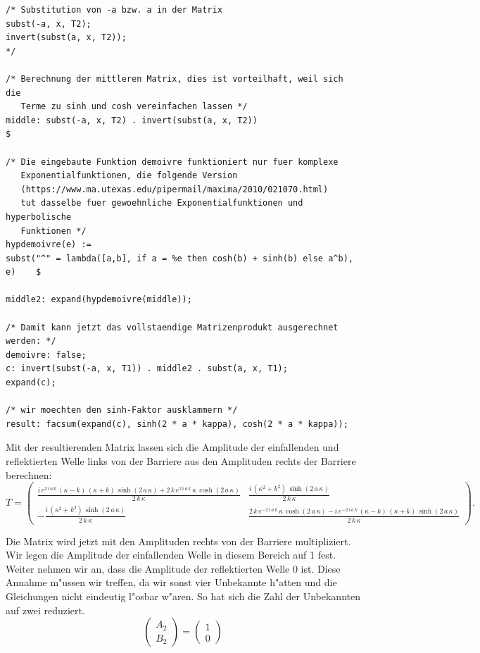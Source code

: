 \begin{refsection}
\begin{lstlisting}[style=Maxima]
/* Substitution von -a bzw. a in der Matrix
subst(-a, x, T2);
invert(subst(a, x, T2));
*/

/* Berechnung der mittleren Matrix, dies ist vorteilhaft, weil sich die
   Terme zu sinh und cosh vereinfachen lassen */
middle: subst(-a, x, T2) . invert(subst(a, x, T2))                          $

/* Die eingebaute Funktion demoivre funktioniert nur fuer komplexe
   Exponentialfunktionen, die folgende Version
   (https://www.ma.utexas.edu/pipermail/maxima/2010/021070.html)
   tut dasselbe fuer gewoehnliche Exponentialfunktionen und hyperbolische
   Funktionen */
hypdemoivre(e) :=
subst("^" = lambda([a,b], if a = %e then cosh(b) + sinh(b) else a^b), e)    $

middle2: expand(hypdemoivre(middle));

/* Damit kann jetzt das vollstaendige Matrizenprodukt ausgerechnet werden: */
demoivre: false;
c: invert(subst(-a, x, T1)) . middle2 . subst(a, x, T1);
expand(c);

/* wir moechten den sinh-Faktor ausklammern */
result: facsum(expand(c), sinh(2 * a * kappa), cosh(2 * a * kappa));

\end{lstlisting}

Mit der resultierenden Matrix lassen sich die Amplitude der einfallenden und reflektierten Welle links von der Barriere aus den Amplituden rechts der Barriere berechnen:
\[
T =
\begin{pmatrix}
\frac{i\,e^{2\,i\,a\,k}\,\left(\kappa-k\right)\,\left(\kappa+k
 \right)\,\sinh \left(2\,a\,\kappa\right)+2\,k\,e^{2\,i\,a\,k}\,
 \kappa\,\cosh \left(2\,a\,\kappa\right)}{2\,k\,\kappa}
&
\frac{i\,
 \left(\kappa^2+k^2\right)\,\sinh \left(2\,a\,\kappa\right)}{2\,
 k\,\kappa}
\\
-\frac{i\,\left(\kappa^2+k^2\right)\,\sinh \left(2\,a\,
 \kappa\right)}{2\,k\,\kappa}
&
\frac{2\,k\,e^ {- 2\,i\,a\,k }\,
 \kappa\,\cosh \left(2\,a\,\kappa\right)-i\,e^ {- 2\,i\,a\,k }\,
 \left(\kappa-k\right)\,\left(\kappa+k\right)\,\sinh \left(2\,a\,
 \kappa\right)}{2\,k\,\kappa}
\end{pmatrix}.
\]

Die Matrix wird jetzt mit den Amplituden rechts von der Barriere multipliziert. 
Wir legen die Amplitude der einfallenden Welle in diesem Bereich auf 1 fest. 
Weiter nehmen wir an, dass die Amplitude der reflektierten Welle 0 ist.
Diese Annahme m"ussen wir treffen, da wir sonst vier Unbekannte h"atten und die Gleichungen nicht eindeutig l"osbar w"aren.
So hat sich die Zahl der Unbekannten auf zwei reduziert.
\[
\begin{pmatrix}
A_2
\\
B_2
\end{pmatrix}
=
\begin{pmatrix}
1
\\
0
\end{pmatrix}
\]


\end{refsection}
